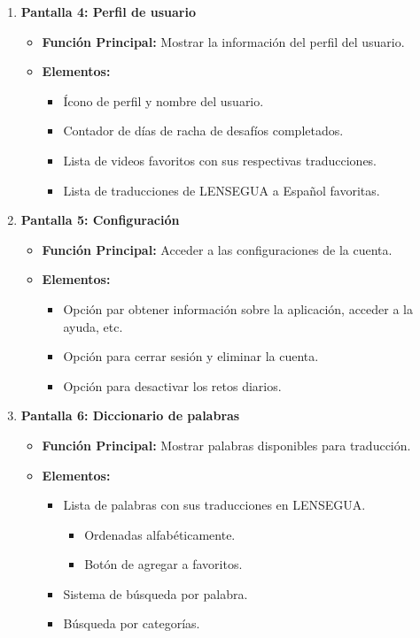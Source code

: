 \begin{enumerate}
    \item \textbf{Pantalla 4: Perfil de usuario}
    \begin{itemize}
        \item \textbf{Función Principal:} Mostrar la información del perfil del usuario.
        \item \textbf{Elementos:}
        \begin{itemize}
            \item Ícono de perfil y nombre del usuario.
            \item Contador de días de racha de desafíos completados.
            \item Lista de videos favoritos con sus respectivas traducciones.
            \item Lista de traducciones de LENSEGUA a Español favoritas. 
        \end{itemize}
    \end{itemize}

    \item \textbf{Pantalla 5: Configuración}
    \begin{itemize}
        \item \textbf{Función Principal:} Acceder a las configuraciones de la cuenta.
        \item \textbf{Elementos:}
        \begin{itemize}
            \item Opción par obtener información sobre la aplicación, acceder a la ayuda, etc. 
            \item Opción para cerrar sesión y eliminar la cuenta.
            \item Opción para desactivar los retos diarios.
        \end{itemize}
    \end{itemize}

    \item \textbf{Pantalla 6: Diccionario de palabras}
    \begin{itemize}
        \item \textbf{Función Principal:} Mostrar palabras disponibles para traducción.
        \item \textbf{Elementos:}
        \begin{itemize}
            \item Lista de palabras con sus traducciones en LENSEGUA.
            \begin{itemize}
                \item Ordenadas alfabéticamente.
                \item Botón de agregar a favoritos.
            \end{itemize}
            \item Sistema de búsqueda por palabra.
            \item Búsqueda por categorías.
        \end{itemize}
    \end{itemize}


\end{enumerate}
